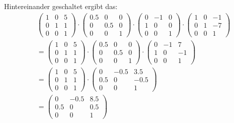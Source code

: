 \documentclass[ngerman, a4paper, 12pt]{article}
\begin{document}
Hintereinander geschaltet ergibt das:
\[
    \begin{aligned}
         & \begin{pmatrix}
               1 & 0 & 5 \\
               0 & 1 & 1 \\
               0 & 0 & 1
           \end{pmatrix}
        \cdot
        \begin{pmatrix}
            0.5 & 0   & 0 \\
            0   & 0.5 & 0 \\
            0   & 0   & 1
        \end{pmatrix}
        \cdot
        \begin{pmatrix}
            0 & -1 & 0 \\
            1 & 0  & 0 \\
            0 & 0  & 1
        \end{pmatrix}
        \cdot
        \begin{pmatrix}
            1 & 0 & -1 \\
            0 & 1 & -7 \\
            0 & 0 & 1
        \end{pmatrix}      \\
         & = \begin{pmatrix}
                 1 & 0 & 5 \\
                 0 & 1 & 1 \\
                 0 & 0 & 1
             \end{pmatrix}
        \cdot
        \begin{pmatrix}
            0.5 & 0   & 0 \\
            0   & 0.5 & 0 \\
            0   & 0   & 1
        \end{pmatrix}
        \cdot
        \begin{pmatrix}
            0 & -1 & 7  \\
            1 & 0  & -1 \\
            0 & 0  & 1
        \end{pmatrix}      \\
         & =
        \begin{pmatrix}
            1 & 0 & 5 \\
            0 & 1 & 1 \\
            0 & 0 & 1
        \end{pmatrix}
        \cdot
        \begin{pmatrix}
            0   & -0.5 & 3.5  \\
            0.5 & 0    & -0.5 \\
            0   & 0    & 1
        \end{pmatrix}   \\
         & =
        \begin{pmatrix}
            0   & -0.5 & 8.5 \\
            0.5 & 0    & 0.5 \\
            0   & 0    & 1
        \end{pmatrix}
    \end{aligned}
\]
\end{document}
